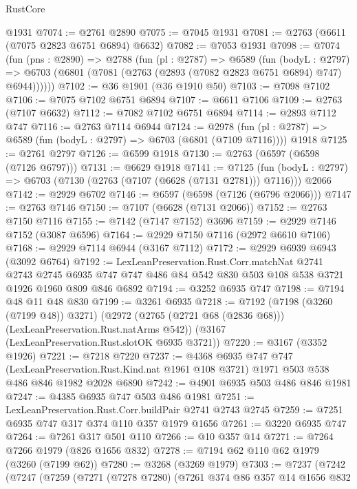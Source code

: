 \begin{lexlean}{RustCore}
\begin{coremodule}
    @1931
@7074 := @2761 @2890
@7075 := @7045 @1931
@7081 := @2763 (@6611 (@7075 @2823 @6751 @6894) @6632)
@7082 := @7053 @1931
@7098 := @7074
    (fun (pns : @2890) =>
    @2788
      (fun (pl : @2787) =>
      @6589
        (fun (bodyL : @2797) =>
        @6703 (@6801 (@7081 (@2763 (@2893 (@7082 @2823 @6751 @6894) @747) @6944))))))
@7102 := @36 @1901 (@36 @1910 @50)
@7103 := @7098 @7102
@7106 := @7075 @7102 @6751 @6894
@7107 := @6611 @7106
@7109 := @2763 (@7107 @6632)
@7112 := @7082 @7102 @6751 @6894
@7114 := @2893 @7112 @747
@7116 := @2763 @7114 @6944
@7124 := @2978
    (fun (pl : @2787) => @6589 (fun (bodyL : @2797) => @6703 (@6801 (@7109 @7116))))
    @1918
@7125 := @2761 @2797
@7126 := @6599 @1918
@7130 := @2763 (@6597 (@6598 (@7126 @6797)))
@7131 := @6629 @1918
@7141 := @7125
    (fun (bodyL : @2797) => @6703 (@7130 (@2763 (@7107 (@6628 (@7131 @2781))) @7116)))
    @2066
@7142 := @2929 @6702
@7146 := @6597 (@6598 (@7126 (@6796 @2066)))
@7147 := @2763 @7146
@7150 := @7107 (@6628 (@7131 @2066))
@7152 := @2763 @7150 @7116
@7155 := @7142 (@7147 @7152) @3696
@7159 := @2929 @7146 @7152 (@3087 @6596)
@7164 := @2929 @7150 @7116 (@2972 @6610 @7106)
@7168 := @2929 @7114 @6944 (@3167 @7112)
@7172 := @2929 @6939 @6943 (@3092 @6764)
@7192 := LexLeanPreservation.Rust.Corr.matchNat
    @2741
    @2743
    @2745
    @6935
    @747
    @747
    @486
    @84
    @542
    @830
    @503
    @108
    @538
    @3721
    @1926
    @1960
    @809
    @846
    @6892
@7194 := @3252 @6935 @747
@7198 := @7194 @48 @11 @48 @830
@7199 := @3261 @6935
@7218 := @7192
    (@7198 (@3260 (@7199 @48)) @3271)
    (@2972 (@2765 (@2721 @68 (@2836 @68))) (LexLeanPreservation.Rust.natArms @542))
    (@3167 (LexLeanPreservation.Rust.slotOK @6935 @3721))
@7220 := @3167 (@3352 @1926)
@7221 := @7218 @7220
@7237 := @4368
    @6935
    @747
    @747
    (LexLeanPreservation.Rust.Kind.nat @1961 @108 @3721)
    @1971
    @503
    @538
    @486
    @846
    @1982
    @2028
    @6890
@7242 := @4901 @6935 @503 @486 @846 @1981
@7247 := @4385 @6935 @747 @503 @486 @1981
@7251 := LexLeanPreservation.Rust.Corr.buildPair @2741 @2743 @2745
@7259 := @7251 @6935 @747 @317 @374 @110 @357 @1979 @1656
@7261 := @3220 @6935 @747
@7264 := @7261 @317 @501 @110
@7266 := @10 @357 @14
@7271 := @7264 @7266 @1979 (@826 @1656 @832)
@7278 := @7194 @62 @110 @62 @1979 (@3260 (@7199 @62))
@7280 := @3268 (@3269 @1979)
@7303 := @7237
    (@7242
      (@7247
        (@7259
          (@7271
            (@7278 @7280)
            (@7261
              @374
              @86
              @357
              @14
              @1656
              @832

\end{coremodule}
\end{lexlean}
